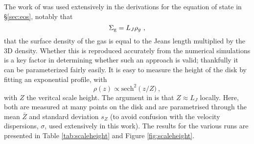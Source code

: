 The work of \citet{schaye2001} was used extensively in the derivations for the equation of state in \S \ref{sec:eos}, notably that
$$
    \Sigma_\mathrm{g} = L_J \rho_g~,
$$
that the surface density of the gas is equal to the Jeans length multiplied by the 3D density.
Whether this is reproduced accurately from the numerical simulations is a key factor in determining whether such an approach is valid; thankfully it can be parameterized fairly easily.
It is easy to measure the height of the disk by fitting an exponential profile, with
$$
    \rho(z) \propto \mathrm{sech}^2\left(z/Z)~,
$$
with $Z$ the veritcal scale height.
The argument in \citet{schaye2001} is that $Z \approx L_J$ locally.
Here, both are measured at many points on the disk and are parametrised through the mean $\bar{Z}$ and standard deviation $s_Z$ (to avoid confusion with the velocity dispersions, $\sigma$, used extensively in this work).
The results for the various runs are presented in Table \ref{tab:scaleheight} and Figure \ref{fig:scaleheight}.
